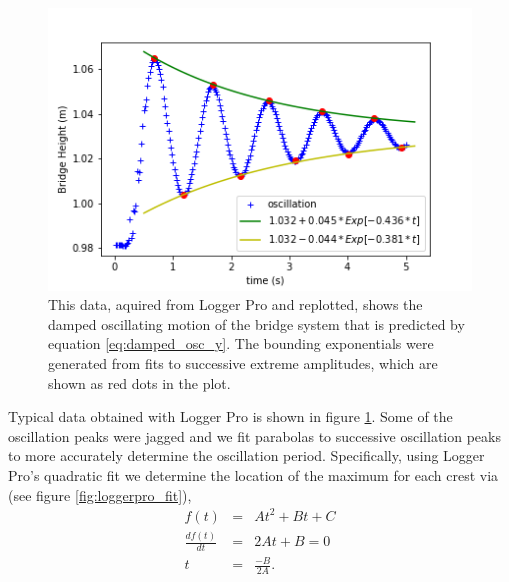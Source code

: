 \documentclass[12pt]{iopart}
\newcommand{\bea}{\begin{eqnarray}}
\newcommand{\eea}{\end{eqnarray}}
\begin{document}
\begin{figure}
\includegraphics[width=\columnwidth]{240_oscillation.png}
\caption{This data, aquired from Logger Pro and replotted, shows the damped oscillating motion of the bridge system that is predicted by equation \ref{eq:damped_osc_y}.  The bounding exponentials were generated from fits to successive extreme amplitudes, which are shown as red dots in the plot.
}
\label{fig:loggerpro_screenshot}
\end{figure}

Typical data obtained with Logger Pro is shown in figure \ref{fig:loggerpro_screenshot}.  Some of the oscillation peaks were jagged and we fit parabolas to successive oscillation peaks to more accurately determine the oscillation period.  Specifically, using Logger Pro's quadratic fit we determine the location of the maximum for each crest via (see figure \ref{fig:loggerpro_fit}), 
\bea
f(t)&=&At^2 + Bt + C\nonumber\\
\frac{d f(t)}{dt} &=& 2At + B=0\nonumber\\
t&=& \frac{-B}{2A}. \label{eq:peak}
\eea
\end{document}

